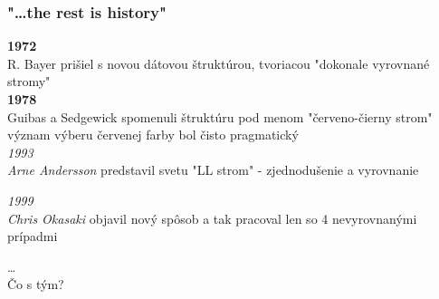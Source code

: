 \documentclass{beamer}
\begin{document}
    \begin{frame}
        \frametitle{"\ldots the rest is history"}

        \textbf{1972}
        \\ {\footnotesize{R. Bayer prišiel s novou dátovou štruktúrou, tvoriacou "dokonale vyrovnané stromy"}} \\

        \vspace{10pt}
        \textbf{1978}
        \\ {\footnotesize{Guibas a Sedgewick spomenuli štruktúru pod menom "červeno-čierny strom" \\
        význam výberu červenej farby bol čisto pragmatický}} \\

        \vspace{10pt}
        \emph{1993}
        \\ {\footnotesize{\emph{Arne Andersson} predstavil svetu "LL strom" - zjednodušenie a vyrovnanie}}

        \vspace{10pt}
        \emph{1999}
        \\ {\footnotesize{\emph{Chris Okasaki} objavil nový spôsob a tak pracoval len so 4 nevyrovnanými prípadmi}}



        \begin{center}
            \ldots \\
            Čo s tým?
        \end{center}
    \end{frame}
\end{document}
